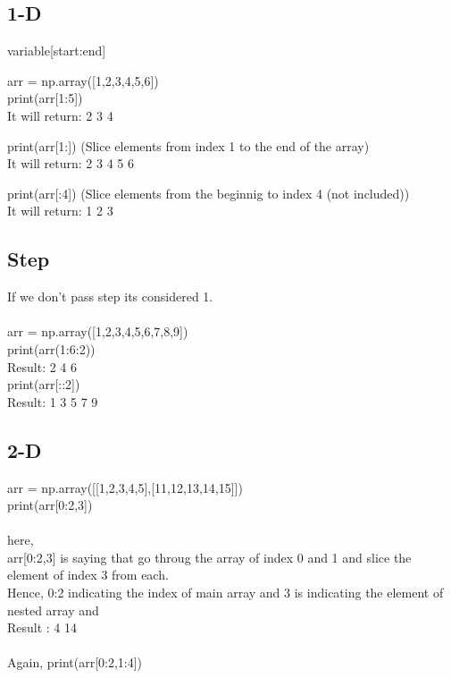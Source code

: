 \documentclass[openany]{book}
\begin{document}
\subsection{1-D}
variable[start:end]

arr = np.array([1,2,3,4,5,6]) \\
print(arr[1:5]) \\
It will return: 2 3 4 

print(arr[1:])  (Slice elements from index 1 to the end of the array)\\  
It will return: 2 3 4 5 6 

print(arr[:4]) (Slice elements from the beginnig to index 4 (not included)) \\
It will return: 1 2 3
\\

\subsection{Step}
If we don't pass step its considered 1.\\
\\
arr = np.array([1,2,3,4,5,6,7,8,9])
\\
print(arr(1:6:2)) \\
Result: 2 4 6 \\

print(arr[::2]) \\
Result: 1 3 5 7 9 \\


\subsection{2-D}
arr = np.array([[1,2,3,4,5],[11,12,13,14,15]]) \\


print(arr[0:2,3]) \\ \\
here, \\ arr[0:2,3] is saying that go throug the array of index 0 and 1 and slice the element of index 3 from each.
 \\
  Hence,   0:2 indicating the index of main array and 3 is indicating the element of nested array and \\

Result : 4 14 \\ \\



Again, print(arr[0:2,1:4]) \\
\end{document}
